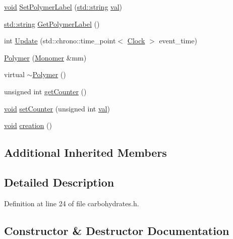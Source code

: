 \begin{DoxyCompactItemize}
\item 
\mbox{\hyperlink{glad_8h_a950fc91edb4504f62f1c577bf4727c29}{void}} \mbox{\hyperlink{class_polymer_ab96200f701d9e2e63d22bdfd434e5ccb}{Set\+Polymer\+Label}} (\mbox{\hyperlink{glad_8h_ae84541b4f3d8e1ea24ec0f466a8c568b}{std\+::string}} \mbox{\hyperlink{glad_8h_a26942fd2ed566ef553eae82d2c109c8f}{val}})
\item 
\mbox{\hyperlink{glad_8h_ae84541b4f3d8e1ea24ec0f466a8c568b}{std\+::string}} \mbox{\hyperlink{class_polymer_a80dbc65ac07e20dce3d9a2e9290c5e3b}{Get\+Polymer\+Label}} ()
\item 
int \mbox{\hyperlink{class_polymer_ac82f603c3010212122008c4ed3953045}{Update}} (std\+::chrono\+::time\+\_\+point$<$ \mbox{\hyperlink{universe_8h_a0ef8d951d1ca5ab3cfaf7ab4c7a6fd80}{Clock}} $>$ event\+\_\+time)
\item 
\mbox{\hyperlink{class_polymer_ae77454a3908652e4df6a26b9cac509a5}{Polymer}} (\mbox{\hyperlink{class_monomer}{Monomer}} \&mm)
\item 
virtual \mbox{\hyperlink{class_polymer_aac2b3983f375a5691c7d5ca1a79594d5}{$\sim$\+Polymer}} ()
\item 
unsigned int \mbox{\hyperlink{class_polymer_a8346d821e5f8690d7816ba1d40036b69}{get\+Counter}} ()
\item 
\mbox{\hyperlink{glad_8h_a950fc91edb4504f62f1c577bf4727c29}{void}} \mbox{\hyperlink{class_polymer_a7ed6bbe09a570b59f9253d63fd3326d2}{set\+Counter}} (unsigned int \mbox{\hyperlink{glad_8h_a26942fd2ed566ef553eae82d2c109c8f}{val}})
\item 
\mbox{\hyperlink{glad_8h_a950fc91edb4504f62f1c577bf4727c29}{void}} \mbox{\hyperlink{class_polymer_a1daba3eb2ba8428bf2f3e814668b155f}{creation}} ()
\end{DoxyCompactItemize}
\subsection*{Additional Inherited Members}


\subsection{Detailed Description}


Definition at line 24 of file carbohydrates.\+h.



\subsection{Constructor \& Destructor Documentation}
\mbox{\label{class_polymer_ae77454a3908652e4df6a26b9cac509a5}} 
